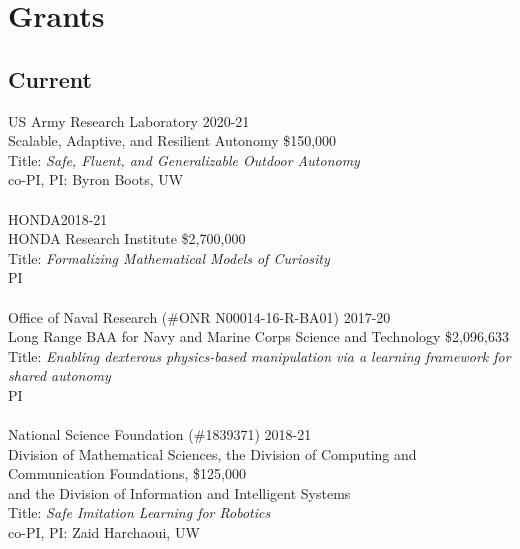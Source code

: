 
\section{Grants}

\subsection{Current}
\noindent
US Army Research Laboratory \hfill 2020-21\\
Scalable, Adaptive, and Resilient Autonomy \hfill \$150,000\\
Title: \textit{Safe, Fluent, and Generalizable Outdoor Autonomy} \\
co-PI, PI: Byron Boots, UW\\
\\
HONDA\hfill 2018-21\\
HONDA Research Institute \hfill \$2,700,000\\
Title: \textit{Formalizing Mathematical Models of Curiosity}\\
PI\\
\\
Office of Naval Research (\#ONR N00014-16-R-BA01) \hfill 2017-20\\
Long Range BAA for Navy and Marine Corps Science and Technology \hfill \$2,096,633 \\
Title: \textit{Enabling dexterous physics-based manipulation via a learning framework for shared autonomy}\\
PI\\
\\
National Science Foundation (\#1839371) \hfill 2018-21\\
Division of Mathematical Sciences, the Division of Computing and Communication Foundations, \hfill \$125,000
\\and the Division of Information and Intelligent Systems\\
Title: \textit{Safe Imitation Learning for Robotics}\\
co-PI, PI: Zaid Harchaoui, UW\\

